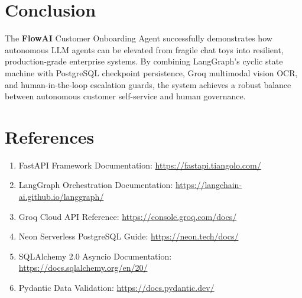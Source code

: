 \documentclass[12pt,a4paper]{article}
\begin{document}

\section{Conclusion}

The \textbf{FlowAI} Customer Onboarding Agent successfully demonstrates how autonomous LLM agents can be elevated from fragile chat toys into resilient, production-grade enterprise systems. By combining LangGraph's cyclic state machine with PostgreSQL checkpoint persistence, Groq multimodal vision OCR, and human-in-the-loop escalation guards, the system achieves a robust balance between autonomous customer self-service and human governance.


\section{References}

\begin{enumerate}
    \item FastAPI Framework Documentation: \url{https://fastapi.tiangolo.com/}
    \item LangGraph Orchestration Documentation: \url{https://langchain-ai.github.io/langgraph/}
    \item Groq Cloud API Reference: \url{https://console.groq.com/docs/}
    \item Neon Serverless PostgreSQL Guide: \url{https://neon.tech/docs/}
    \item SQLAlchemy 2.0 Asyncio Documentation: \url{https://docs.sqlalchemy.org/en/20/}
    \item Pydantic Data Validation: \url{https://docs.pydantic.dev/}
\end{enumerate}
\end{document}
